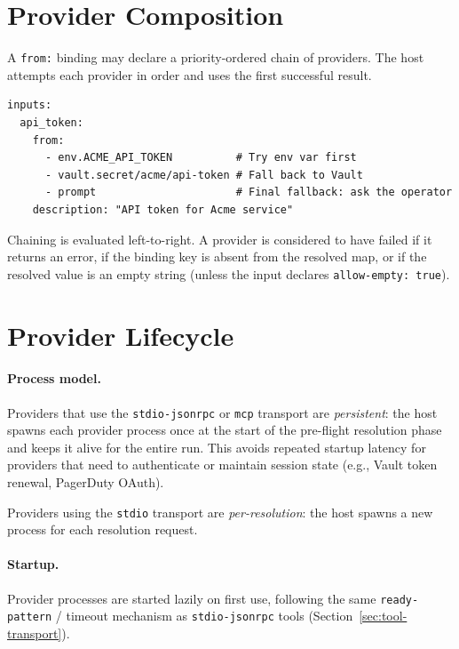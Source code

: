 \section{Provider Composition}
\label{sec:provider-composition}

A \texttt{from:} binding may declare a priority-ordered chain of providers.
The host attempts each provider in order and uses the first successful result.

\begin{verbatim}
inputs:
  api_token:
    from:
      - env.ACME_API_TOKEN          # Try env var first
      - vault.secret/acme/api-token # Fall back to Vault
      - prompt                      # Final fallback: ask the operator
    description: "API token for Acme service"
\end{verbatim}

Chaining is evaluated left-to-right.  A provider is considered to have failed
if it returns an error, if the binding key is absent from the resolved map, or
if the resolved value is an empty string (unless the input declares
\texttt{allow-empty: true}).

\section{Provider Lifecycle}
\label{sec:provider-lifecycle}

\paragraph{Process model.}
Providers that use the \texttt{stdio-jsonrpc} or \texttt{mcp} transport are
\emph{persistent}: the host spawns each provider process once at the start of
the pre-flight resolution phase and keeps it alive for the entire run.  This
avoids repeated startup latency for providers that need to authenticate or
maintain session state (e.g., Vault token renewal, PagerDuty OAuth).

Providers using the \texttt{stdio} transport are \emph{per-resolution}: the
host spawns a new process for each resolution request.

\paragraph{Startup.}
Provider processes are started lazily on first use, following the same
\texttt{ready-pattern} / timeout mechanism as \texttt{stdio-jsonrpc} tools
(Section~\ref{sec:tool-transport}).


